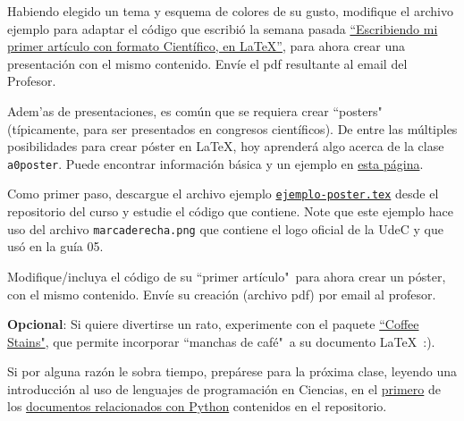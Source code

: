 \documentclass[11pt]{exam}
\begin{document}
\begin{questions}
\item Habiendo elegido un tema y esquema de colores de su gusto, modifique el archivo ejemplo para adaptar el código que escribió la semana pasada \href{https://github.com/gfrubi/CC/blob/master/guias/05/ejemplo-articulo.pdf}{``Escribiendo mi primer artículo con formato Científico, en \LaTeX''}, para ahora crear una presentación con el mismo contenido. Envíe el pdf resultante al email del Profesor. 

\item Adem'as de presentaciones, es común que se requiera crear ``posters"\, (típicamente, para ser presentados en congresos científicos). De entre las múltiples posibilidades para crear póster en \LaTeX, hoy aprenderá algo acerca de la clase \texttt{a0poster}. Puede encontrar información básica y un ejemplo en \href{https://www.latextemplates.com/template/a0poster-portrait-poster}{esta página}.

\item Como primer paso, descargue el archivo ejemplo \href{https://github.com/gfrubi/CC/blob/master/guias/06/ejemplo-poster.tex}{\texttt{ejemplo-poster.tex}} desde el repositorio del curso y estudie el código que contiene. Note que este ejemplo hace uso del archivo \texttt{marcaderecha.png} que contiene el logo oficial de la UdeC y que usó en la guía 05.

\item Modifique/incluya el código de su ``primer artículo"\, para ahora crear un póster, con el mismo contenido. Envíe su creación (archivo pdf) por email al profesor.

\item \textbf{Opcional}: Si quiere divertirse un rato, experimente con el paquete \href{http://hanno-rein.de/archives/349}{``Coffee Stains"}, que permite incorporar ``manchas de café"\, a su documento \LaTeX\ :). 

\item Si por alguna razón le sobra tiempo, prepárese para la próxima clase, leyendo una introducción al uso de lenguajes de programación en Ciencias, en el \href{https://github.com/gfrubi/CC/blob/master/Python/00-Computacion-Cientifica-con-Python.ipynb}{primero} de los \href{https://github.com/gfrubi/CC/tree/master/Python}{documentos relacionados con Python} contenidos en el repositorio.
\end{questions}
\end{document}
